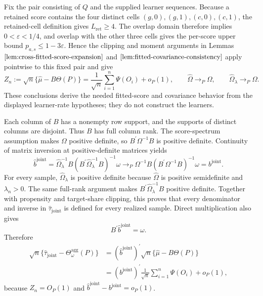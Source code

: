 Fix the pair consisting of \(Q\) and the supplied learner sequences. Because a retained score contains the four distinct cells \((g,0),(g,1),(c,0),(c,1)\), the retained-cell definition gives \(L_{\mathrm{ret}}\ge4\). The overlap domain therefore implies \(0<\varepsilon<1/4\), and overlap with the other three cells gives the per-score upper bound \(p_{a,s}\le1-3\varepsilon\). Hence the clipping and moment arguments in Lemmas \(\ref{lem:cross-fitted-score-expansion}\) and \(\ref{lem:fitted-covariance-consistency}\) apply pointwise to this fixed pair and give
\[
Z_n:=\sqrt n\{\widehat\mu-B\Theta(P)\}
=\frac1{\sqrt n}\sum_{i=1}^n\Psi(O_i)+o_P(1),
\qquad
\widehat\Omega\to_P\Omega,
\qquad
\widehat\Omega_\lambda\to_P\Omega.
\]
These conclusions derive the needed fitted-score and covariance behavior from the displayed learner-rate hypotheses; they do not construct the learners.

Each column of \(B\) has a nonempty row support, and the supports of distinct columns are disjoint. Thus \(B\) has full column rank. The score-spectrum assumption makes \(\Omega\) positive definite, so \(B^{\prime}\Omega^{-1}B\) is positive definite. Continuity of matrix inversion at positive-definite matrices yields
\[
\widehat b^{\mathrm{joint}}
=\widehat\Omega_\lambda^{-1}B
 (B^{\prime}\widehat\Omega_\lambda^{-1}B)^{-1}\omega
\to_P
\Omega^{-1}B(B^{\prime}\Omega^{-1}B)^{-1}\omega
=b^{\mathrm{joint}}.
\]
For every sample, \(\widehat\Omega_\lambda\) is positive definite because \(\widehat\Omega\) is positive semidefinite and \(\lambda_n>0\). The same full-rank argument makes \(B^{\prime}\widehat\Omega_\lambda^{-1}B\) positive definite. Together with propensity and target-share clipping, this proves that every denominator and inverse in \(\widehat\tau_{\mathrm{joint}}\) is defined for every realized sample. Direct multiplication also gives
\[
B^{\prime}\widehat b^{\mathrm{joint}}=\omega.
\]
Therefore
\[
\begin{aligned}
\sqrt n\{\widehat\tau_{\mathrm{joint}}-\Theta_\omega^{\mathrm{agg}}(P)\}
&=(\widehat b^{\mathrm{joint}})^{\prime}
  \sqrt n\{\widehat\mu-B\Theta(P)\}\\
&=(b^{\mathrm{joint}})^{\prime}\frac1{\sqrt n}
  \sum_{i=1}^n\Psi(O_i)+o_P(1),
\end{aligned}
\]
because \(Z_n=O_P(1)\) and \(\widehat b^{\mathrm{joint}}-b^{\mathrm{joint}}=o_P(1)\).

